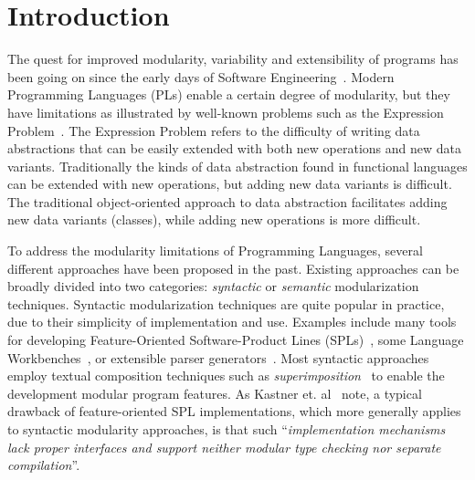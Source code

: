 \section{Introduction}\label{sec:introduction}

The quest for improved modularity, variability and extensibility of
programs has been going on since the early days of Software
Engineering~\cite{McIlroy68}. Modern Programming Languages (PLs) enable a certain
degree of modularity, but they have limitations as illustrated by
well-known problems such as the Expression Problem~\cite{wadler1998expression}. The
Expression Problem refers to the difficulty of writing data
abstractions that can be easily extended with both new operations and
new data variants. Traditionally the kinds of data abstraction found
in functional languages can be extended with new operations, but
adding new data variants is difficult. The traditional object-oriented
approach to data abstraction facilitates adding new data variants
(classes), while adding new operations is more difficult.

To address the modularity limitations of Programming Languages, several
different approaches have been proposed in the past. Existing
approaches can be broadly divided into two categories:
\emph{syntactic} or \emph{semantic} modularization
techniques. Syntactic modularization techniques are quite popular in
practice, due to their simplicity of implementation and use.
Examples include many tools for developing Feature-Oriented Software-Product
Lines (SPLs)~\cite{AK:JOT09,Kastner11road}, some Language Workbenches~\cite{Erdweg201524}, or extensible parser
generators~\cite{antlr1995,Grimm2006,Gouseti2014,Viera2012,Warth2016,schwerdfeger09}.  Most syntactic approaches employ textual
composition techniques such as \emph{superimposition}~\cite{AK:JOT09} to
enable the development modular program features.
As Kastner et. al~\cite{Kastner11road} note,
a typical drawback of feature-oriented SPL implementations, which
more generally applies to syntactic modularity approaches, is that
such ``\emph{implementation mechanisms lack proper
  interfaces and support neither modular type checking nor separate
  compilation}''.

\begin{comment}
Syntactic modularization techniques have also been applied to the
problem of \emph{extensible parsing}. Many parser
generators~\cite{antlr1995,Grimm2006,Gouseti2014,Warth2016} support
modular grammars. For instance, \textit{Rats!}~\cite{Grimm2006} has
its own module system for the collection of grammars.  Extensible
compilers like JastAdd~\cite{Ekman2007} and
Polyglot~\cite{Nystrom2003} also support extensible parsing, but this
is mostly done ultimately resorting to standard (non-modular) parser
generators. Various techniques supporting languages that can extend
their own syntax, such as SugarJ~\cite{Erdweg2011}, also offer a form
of extensible parsing. However those syntactic approaches do not
support separate compilation and/or modular type-checking
of parsing code either.
\end{comment}

